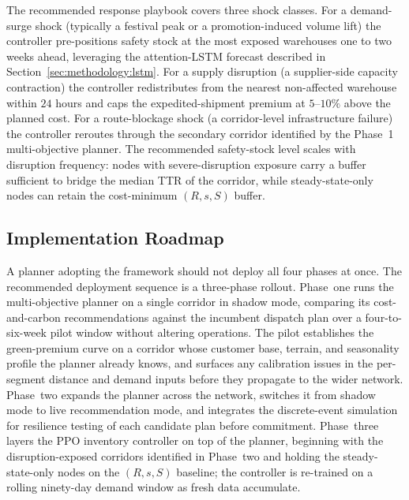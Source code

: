 \documentclass[review,preprint,authoryear,12pt]{elsarticle}
\begin{document}
The recommended response playbook covers three shock classes. For a
demand-surge shock (typically a festival peak or a promotion-induced
volume lift) the controller pre-positions safety stock at the most
exposed warehouses one to two weeks ahead, leveraging the
attention-LSTM forecast described in
Section~\ref{sec:methodology:lstm}. For a supply disruption (a
supplier-side capacity contraction) the controller redistributes from
the nearest non-affected warehouse within $24$ hours and caps the
expedited-shipment premium at $5$--$10\%$ above the planned cost. For
a route-blockage shock (a corridor-level infrastructure failure) the
controller reroutes through the secondary corridor identified by the
Phase~1 multi-objective planner. The recommended safety-stock level
scales with disruption frequency: nodes with severe-disruption
exposure carry a buffer sufficient to bridge the median TTR of the
corridor, while steady-state-only nodes can retain the cost-minimum
$(R, s, S)$ buffer.

\subsection{Implementation Roadmap}
\label{sec:managerial:roadmap}

A planner adopting the framework should not deploy all four phases at
once. The recommended deployment sequence is a three-phase rollout.
Phase~one runs the multi-objective planner on a single corridor in
shadow mode, comparing its cost-and-carbon recommendations against
the incumbent dispatch plan over a four-to-six-week pilot window
without altering operations. The pilot establishes the green-premium
curve on a corridor whose customer base, terrain, and seasonality
profile the planner already knows, and surfaces any calibration
issues in the per-segment distance and demand inputs before they
propagate to the wider network. Phase~two expands the planner across
the network, switches it from shadow mode to live recommendation
mode, and integrates the discrete-event simulation for resilience
testing of each candidate plan before commitment. Phase~three layers
the PPO inventory controller on top of the planner, beginning with
the disruption-exposed corridors identified in Phase~two and holding
the steady-state-only nodes on the $(R, s, S)$ baseline; the
controller is re-trained on a rolling ninety-day demand window as
fresh data accumulate.
\end{document}
